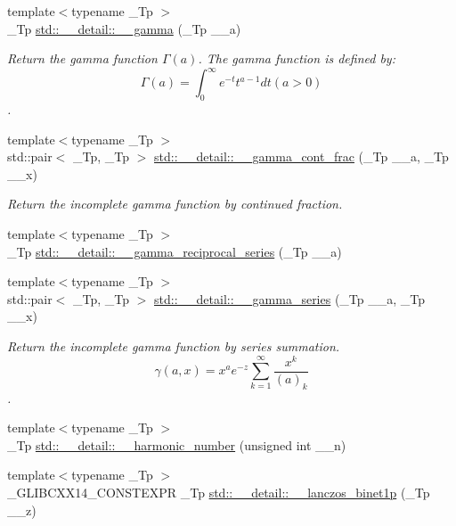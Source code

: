 \begin{DoxyCompactItemize}
{\footnotesize template$<$typename \+\_\+\+Tp $>$ }\\\+\_\+\+Tp \hyperlink{namespacestd_1_1____detail_a178e0b2cc0ae66b7d958e837da4fe4c1}{std\+::\+\_\+\+\_\+detail\+::\+\_\+\+\_\+gamma} (\+\_\+\+Tp \+\_\+\+\_\+a)
\begin{DoxyCompactList}\small\item\em Return the gamma function $ \Gamma(a) $. The gamma function is defined by\+: \[ \Gamma(a) = \int_0^\infty e^{-t}t^{a-1}dt (a > 0) \]. \end{DoxyCompactList}\item 
{\footnotesize template$<$typename \+\_\+\+Tp $>$ }\\std\+::pair$<$ \+\_\+\+Tp, \+\_\+\+Tp $>$ \hyperlink{namespacestd_1_1____detail_afd6319747af991947a02388acee40c26}{std\+::\+\_\+\+\_\+detail\+::\+\_\+\+\_\+gamma\+\_\+cont\+\_\+frac} (\+\_\+\+Tp \+\_\+\+\_\+a, \+\_\+\+Tp \+\_\+\+\_\+x)
\begin{DoxyCompactList}\small\item\em Return the incomplete gamma function by continued fraction. \end{DoxyCompactList}\item 
{\footnotesize template$<$typename \+\_\+\+Tp $>$ }\\\+\_\+\+Tp \hyperlink{namespacestd_1_1____detail_a08dc6d850e2f02ff45deaa4772298cf3}{std\+::\+\_\+\+\_\+detail\+::\+\_\+\+\_\+gamma\+\_\+reciprocal\+\_\+series} (\+\_\+\+Tp \+\_\+\+\_\+a)
\item 
{\footnotesize template$<$typename \+\_\+\+Tp $>$ }\\std\+::pair$<$ \+\_\+\+Tp, \+\_\+\+Tp $>$ \hyperlink{namespacestd_1_1____detail_aa480c595e1c5b894d76398cf0e8eb02b}{std\+::\+\_\+\+\_\+detail\+::\+\_\+\+\_\+gamma\+\_\+series} (\+\_\+\+Tp \+\_\+\+\_\+a, \+\_\+\+Tp \+\_\+\+\_\+x)
\begin{DoxyCompactList}\small\item\em Return the incomplete gamma function by series summation. \[ \gamma(a,x) = x^a e^{-z}\sum_{k=1}^{\infty} \frac{x^k}{(a)_k} \]. \end{DoxyCompactList}\item 
{\footnotesize template$<$typename \+\_\+\+Tp $>$ }\\\+\_\+\+Tp \hyperlink{namespacestd_1_1____detail_aeab2857a72e09b180a765bf435f72c2e}{std\+::\+\_\+\+\_\+detail\+::\+\_\+\+\_\+harmonic\+\_\+number} (unsigned int \+\_\+\+\_\+n)
\item 
{\footnotesize template$<$typename \+\_\+\+Tp $>$ }\\\+\_\+\+G\+L\+I\+B\+C\+X\+X14\+\_\+\+C\+O\+N\+S\+T\+E\+X\+PR \+\_\+\+Tp \hyperlink{namespacestd_1_1____detail_a84722b82d6d614aa4653eb7559f7d508}{std\+::\+\_\+\+\_\+detail\+::\+\_\+\+\_\+lanczos\+\_\+binet1p} (\+\_\+\+Tp \+\_\+\+\_\+z)

\end{DoxyCompactItemize}
